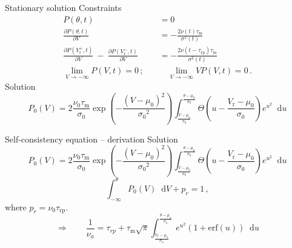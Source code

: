 \documentclass[xcolor=x11names,compress]{beamer}
\renewcommand{\(}{\begin{columns}}
\renewcommand{\)}{\end{columns}}
\newcommand{\<}[1]{\begin{column}{#1}}
\renewcommand{\>}{\end{column}}
\newcommand*\diff{\mathop{}\!\text{d}}
\begin{document}
\begin{frame}[t]{Stationary solution}
    Constraints
\begin{align*}
    P(\theta, t) &= 0  \\
    \frac{\partial P(\theta, t)}{\partial V}    
        &= - \frac{2 \nu(t) \tau_\text{m}}{\sigma^2(t)}  \\
    \frac{\partial P(V_\text{r}^+, t)}{\partial V} \: -  \: \frac{\partial P(V_\text{r}^-, t)}{\partial V} 
        &= - \frac{2 \nu(t - \tau_\text{rp}) \tau_\text{m}}{\sigma^2(t)} \\
\lim_{V \to -\infty} P(V, t) = 0 \, ;
\quad  & \quad
    \lim_{V \to -\infty} V P(V, t) = 0 \,.
\end{align*}
    \vfill
    Solution
    \begin{equation*}
        P_0(V) = 2 \frac{\nu_0 \tau_\text{m}}{\sigma_0} 
            \exp{\left(- \frac{(V - \mu_0)^2}{{\sigma_0}^2} \right)}
            \int_{\frac{V - \mu_0}{\sigma_0}}^{\frac{\theta - \mu_0}{\sigma_0}} \! 
                \Theta \left(u - \frac{V_\text{r} - \mu_0}{\sigma_0} \right) e^{u^2} \diff u  
    \end{equation*}

\end{frame}

\begin{frame}[t]{Self-consistency equation -- derivation}
    Solution
    \begin{equation*}
        P_0(V) = 2 \frac{\nu_0 \tau_\text{m}}{\sigma_0} 
            \exp{\left(- \frac{(V - \mu_0)^2}{{\sigma_0}^2} \right)}
            \int_{\frac{V - \mu_0}{\sigma_0}}^{\frac{\theta - \mu_0}{\sigma_0}} \! 
                \Theta \left(u - \frac{V_\text{r} - \mu_0}{\sigma_0} \right) e^{u^2} \diff u  
    \end{equation*} 
    \begin{equation*}
        \int_{-\infty}^{\theta} \! P_0(V) \diff V  + p_r = 1 \, ,
    \end{equation*}
    where \qquad $p_r = \nu_0 \tau_\text{rp}$. \\
\vspace{1cm}
    \begin{equation*}
        \Rightarrow \qquad
        \frac{1}{\nu_{a}} = \tau_{rp} 
            + \tau_\text{m} \sqrt{\pi}
                \int_{\frac{V_\text{r} - \mu_{a}}{\sigma_{a}}}^{\frac{\theta - \mu_{a}}{\sigma_{a}}} 
                    e^{u^2} \left(1 + \text{erf}(u)\right) \diff u  
    \end{equation*}
\end{frame}
\end{document}
